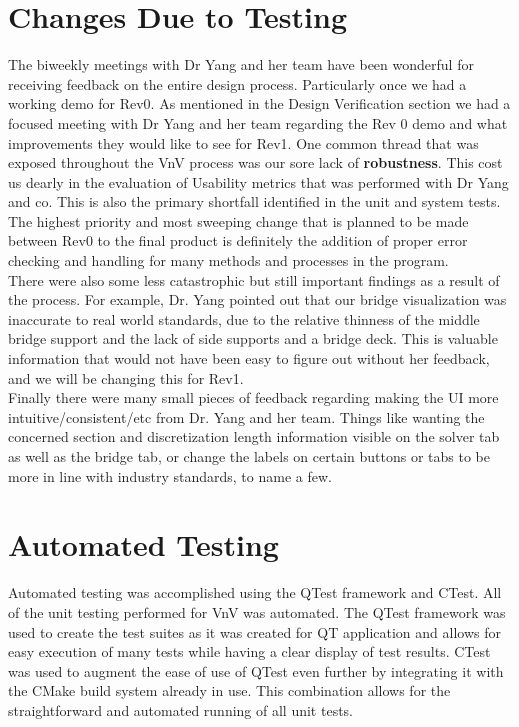 \documentclass[12pt, titlepage]{article}
\begin{document}
    
\section{Changes Due to Testing}

The biweekly meetings with Dr Yang and her team have been wonderful for receiving feedback on the entire design process. Particularly once we had a working demo for Rev0.
As mentioned in the Design Verification section we had a focused meeting with Dr Yang and her team regarding the Rev 0 demo and what improvements they would like to see for
Rev1. One common thread that was exposed throughout the VnV process was our sore lack of \textbf{robustness}. This cost us dearly in the evaluation of Usability metrics that
was performed with Dr Yang and co. This is also the primary shortfall identified in the unit and system tests. The highest priority and most sweeping change 
that is planned to be made between Rev0 to the final product is definitely the addition of proper error checking and handling for many methods and processes in the program.\\

There were also some less catastrophic but still important findings as a result of the process. For example, Dr. Yang pointed out that our bridge visualization was inaccurate to real world
standards, due to the relative thinness of the middle bridge support and the lack of side supports and a bridge deck. This is valuable information that would not have been
easy to figure out without her feedback, and we will be changing this for Rev1.\\

Finally there were many small pieces of feedback regarding making the UI more intuitive/consistent/etc from Dr. Yang and her team. Things like wanting the concerned section
and discretization length information visible on the solver tab as well as the bridge tab, or change the labels on certain buttons or tabs to be more in line with industry
standards, to name a few.\\

\section{Automated Testing}
Automated testing was accomplished using the QTest framework and CTest. All of the unit testing performed for VnV was automated. The QTest framework was used to create the test suites as it was created for QT application and allows for easy execution of many tests while having a clear display of test results. CTest was used to augment the ease of use of QTest even further by integrating it with the CMake build system already in use. This combination allows for the straightforward and automated running of all unit tests.
\end{document}
